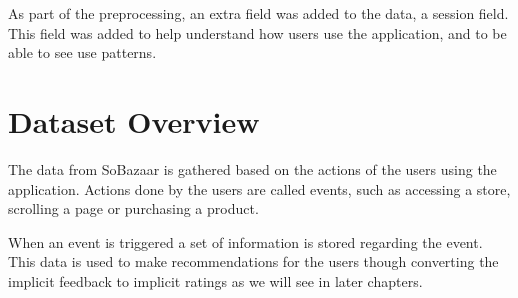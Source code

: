     As part of the preprocessing, an extra field was added to the data, a session field.
    This field was added to help understand how users use the application, and to be able to see use patterns.

\section{Dataset Overview}
    The data from SoBazaar is gathered based on the actions of the users using the application.
    Actions done by the users are called events, such as accessing a store, scrolling a page or purchasing a product.

    When an event is triggered a set of information is stored regarding the event.
    This data is used to make recommendations for the users though converting the implicit feedback to implicit ratings as we will see in later chapters.


